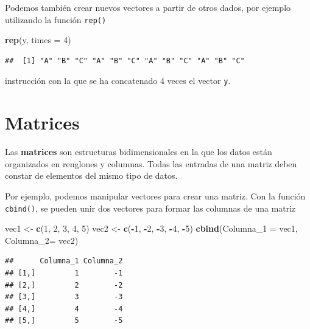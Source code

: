 \documentclass[
]{book}
\newenvironment{Shaded}{\begin{snugshade}}{\end{snugshade}}
\newcommand{\AttributeTok}[1]{\textcolor[rgb]{0.13,0.29,0.53}{#1}}
\newcommand{\DecValTok}[1]{\textcolor[rgb]{0.00,0.00,0.81}{#1}}
\newcommand{\FunctionTok}[1]{\textcolor[rgb]{0.13,0.29,0.53}{\textbf{#1}}}
\newcommand{\NormalTok}[1]{#1}
\newcommand{\OtherTok}[1]{\textcolor[rgb]{0.56,0.35,0.01}{#1}}
\newcommand{\SpecialCharTok}[1]{\textcolor[rgb]{0.81,0.36,0.00}{\textbf{#1}}}
\begin{document}
Podemos también crear nuevos vectores a partir de otros dados, por ejemplo utilizando la función \texttt{rep()}

\begin{Shaded}
\begin{Highlighting}[]
\FunctionTok{rep}\NormalTok{(y, }\AttributeTok{times =} \DecValTok{4}\NormalTok{)}
\end{Highlighting}
\end{Shaded}

\begin{verbatim}
##  [1] "A" "B" "C" "A" "B" "C" "A" "B" "C" "A" "B" "C"
\end{verbatim}

instrucción con la que se ha concatenado 4 veces el vector \texttt{y}.

\hypertarget{matrices}{%
\section{Matrices}\label{matrices}}

Las \textbf{matrices} son estructuras bidimensionales en la que los datos están organizados en renglones y columnas. Todas las entradas de una matriz deben constar de elementos del mismo tipo de datos.

Por ejemplo, podemos manipular vectores para crear una matriz. Con la función \texttt{cbind()}, se pueden unir dos vectores para formar las columnas de una matriz

\begin{Shaded}
\begin{Highlighting}[]
\NormalTok{vec1 }\OtherTok{\textless{}{-}} \FunctionTok{c}\NormalTok{(}\DecValTok{1}\NormalTok{, }\DecValTok{2}\NormalTok{, }\DecValTok{3}\NormalTok{, }\DecValTok{4}\NormalTok{, }\DecValTok{5}\NormalTok{)}
\NormalTok{vec2 }\OtherTok{\textless{}{-}} \FunctionTok{c}\NormalTok{(}\SpecialCharTok{{-}}\DecValTok{1}\NormalTok{, }\SpecialCharTok{{-}}\DecValTok{2}\NormalTok{, }\SpecialCharTok{{-}}\DecValTok{3}\NormalTok{, }\SpecialCharTok{{-}}\DecValTok{4}\NormalTok{, }\SpecialCharTok{{-}}\DecValTok{5}\NormalTok{)}
\FunctionTok{cbind}\NormalTok{(}\AttributeTok{Columna\_1 =}\NormalTok{ vec1, }\AttributeTok{Columna\_2=}\NormalTok{ vec2)}
\end{Highlighting}
\end{Shaded}

\begin{verbatim}
##      Columna_1 Columna_2
## [1,]         1        -1
## [2,]         2        -2
## [3,]         3        -3
## [4,]         4        -4
## [5,]         5        -5
\end{verbatim}
\end{document}

